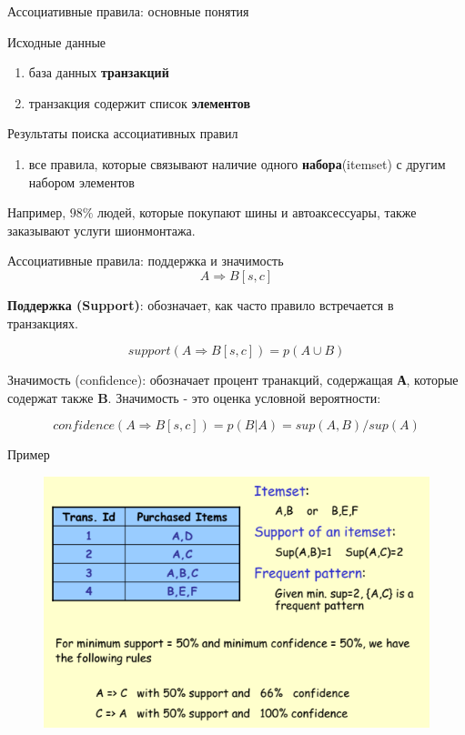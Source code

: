 \documentclass{beamer}
\begin{document}
\begin{frame}{Ассоциативные правила: основные понятия}
\begin{block}{Исходные данные}
  \begin{enumerate}
  \item база данных \textbf{транзакций}
  \item транзакция содержит список \textbf{элементов}
  \end{enumerate}
\end{block}
\begin{block}{Результаты поиска ассоциативных правил}
  \begin{enumerate}
  \item все правила, которые связывают наличие одного \textbf{набора}(itemset) с другим набором элементов
  \end{enumerate}
\end{block}
Например, $98\%$ людей, которые покупают шины и автоаксессуары, также заказывают услуги шионмонтажа.
\end{frame}

\begin{frame}{Ассоциативные правила: поддержка и значимость}
\[A \Rightarrow B [ s, c ]\]

\textbf{Поддержка (Support)}: обозначает, как часто правило встречается в транзакциях. 

\[support(A \Rightarrow B [ s, c ]) = p(A \cup B)\]

Значимость (confidence): обозначает процент транакций, содержащая \textbf{А}, которые содержат также \textbf{B}. Значимость - это оценка условной вероятности:

\[confidence(A \Rightarrow B [ s, c ]) = p(B|A) = sup(A,B)/sup(A)\]
\end{frame}

\begin{frame}{Пример}
\begin{figure}[h]
\centering
\includegraphics[scale=0.75]{images/lec08-pic04.png}
\end{figure}
\end{frame}
\end{document}
